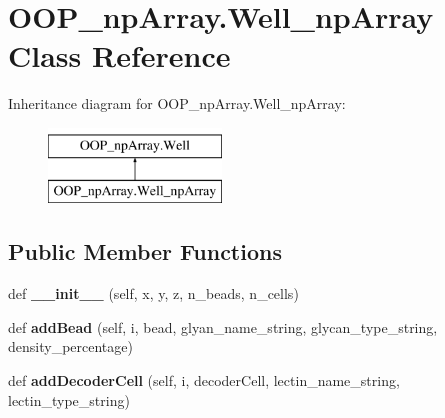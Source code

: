 \hypertarget{class_o_o_p__np_array_1_1_well__np_array}{}\section{O\+O\+P\+\_\+np\+Array.\+Well\+\_\+np\+Array Class Reference}
\label{class_o_o_p__np_array_1_1_well__np_array}
Inheritance diagram for O\+O\+P\+\_\+np\+Array.\+Well\+\_\+np\+Array\+:\begin{figure}[H]
\begin{center}
\leavevmode
\includegraphics[height=2.000000cm]{class_o_o_p__np_array_1_1_well__np_array}
\end{center}
\end{figure}
\subsection*{Public Member Functions}
\begin{DoxyCompactItemize}
\item 
\mbox{\label{class_o_o_p__np_array_1_1_well__np_array_a444855f0c55c0420a6ef5d5c0ac3214a}} 
def {\bfseries \+\_\+\+\_\+init\+\_\+\+\_\+} (self, x, y, z, n\+\_\+beads, n\+\_\+cells)
\item 
\mbox{\label{class_o_o_p__np_array_1_1_well__np_array_a2a7090962b7123e4400fa3343e0c1289}} 
def {\bfseries add\+Bead} (self, i, bead, glyan\+\_\+name\+\_\+string, glycan\+\_\+type\+\_\+string, density\+\_\+percentage)
\item 
\mbox{\label{class_o_o_p__np_array_1_1_well__np_array_a736fded2de7a8996ddceb86a38ee6fa4}} 
def {\bfseries add\+Decoder\+Cell} (self, i, decoder\+Cell, lectin\+\_\+name\+\_\+string, lectin\+\_\+type\+\_\+string)
\end{DoxyCompactItemize}
